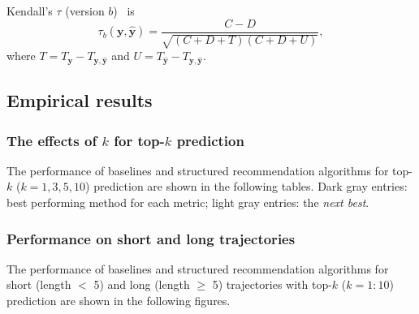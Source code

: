 Kendall's $\tau$ (version $b$)~\cite{agresti2010analysis} is %
\begin{equation*}
\tau_b(\mathbf{y}, \hat{\mathbf{y}}) = \frac{C - D}{\sqrt{(C + D + T) (C + D + U)}},
\end{equation*}
where $T = T_{\mathbf{y}} - T_{\mathbf{y},\hat{\mathbf{y}}}$ and $U = T_{\hat{\mathbf{y}}} - T_{\mathbf{y},\hat{\mathbf{y}}}$.


\subsection{Empirical results}

\subsubsection{The effects of $k$ for top-$k$ prediction}
The performance of baselines and structured recommendation algorithms for top-$k$ ($k=1,3,5,10$) 
prediction are shown in the following tables.
Dark gray entries: best performing method for each metric; light gray entries: the \textit{next best}. 



\subsubsection{Performance on short and long trajectories}
The performance of baselines and structured recommendation algorithms 
for short (length $<$ 5) and long (length $\ge$ 5) trajectories 
with top-$k$ ($k=1:10$) prediction are shown in the following figures.

\clearpage
%

